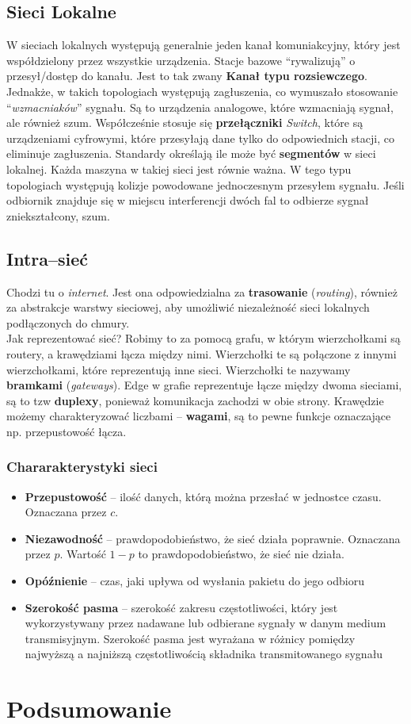 \documentclass[11pt,a4paper]{article}
\begin{document}
\subsection{Sieci Lokalne}
W sieciach lokalnych występują generalnie jeden kanał komuniakcyjny, który jest współdzielony przez wszystkie urządzenia. Stacje bazowe ``rywalizują'' o przesył/dostęp do kanału. Jest to tak zwany \textbf{Kanał typu rozsiewczego}. Jednakże, w takich topologiach występują zagłuszenia, co wymuszało stosowanie ``\textit{wzmacniaków}'' sygnału. Są to urządzenia analogowe, które wzmacniają sygnał, ale również szum. Współcześnie stosuje się \textbf{przełączniki} \textit{Switch}, które są urządzeniami cyfrowymi, które przesyłają dane tylko do odpowiednich stacji, co eliminuje zagłuszenia. Standardy określają ile może być \textbf{segmentów} w sieci lokalnej. Każda maszyna w takiej sieci jest równie ważna.
W tego typu topologiach występują kolizje powodowane jednoczesnym przesyłem sygnału. Jeśli odbiornik znajduje się w miejscu interferencji dwóch fal to odbierze sygnał zniekształcony, szum.
\subsection{Intra--sieć}
Chodzi tu o \textit{internet}. Jest ona odpowiedzialna za \textbf{trasowanie} (\textit{routing}), również za abstrakcje warstwy sieciowej, aby umożliwić niezależność sieci lokalnych podłączonych do chmury.\\
Jak reprezentować sieć? Robimy to za pomocą grafu, w którym wierzchołkami są routery, a krawędziami łącza między nimi. Wierzchołki te są połączone z innymi wierzchołkami, które reprezentują inne sieci. Wierzchołki te nazywamy \textbf{bramkami} (\textit{gateways}). Edge w grafie reprezentuje łącze między dwoma sieciami, są to tzw \textbf{duplexy}, ponieważ komunikacja zachodzi w obie strony. Krawędzie możemy charakteryzować liczbami -- \textbf{wagami}, są to pewne funkcje oznaczające np. przepustowość łącza.
\subsubsection{Chararakterystyki sieci}
\begin{itemize}
    \item \textbf{Przepustowość} -- ilość danych, którą można przesłać w jednostce czasu. Oznaczana przez $c$.
    \item \textbf{Niezawodność} -- prawdopodobieństwo, że sieć działa poprawnie. Oznaczana przez $p$. Wartość $1-p$ to prawdopodobieństwo, że sieć nie działa.
    \item \textbf{Opóźnienie} -- czas, jaki upływa od wysłania pakietu do jego odbioru
    \item \textbf{Szerokość pasma} -- szerokość zakresu częstotliwości, który jest wykorzystywany przez nadawane lub odbierane sygnały w danym medium transmisyjnym. Szerokość pasma jest wyrażana w różnicy pomiędzy najwyższą a najniższą częstotliwością składnika transmitowanego sygnału
\end{itemize}
\section{Podsumowanie}
\end{document}
